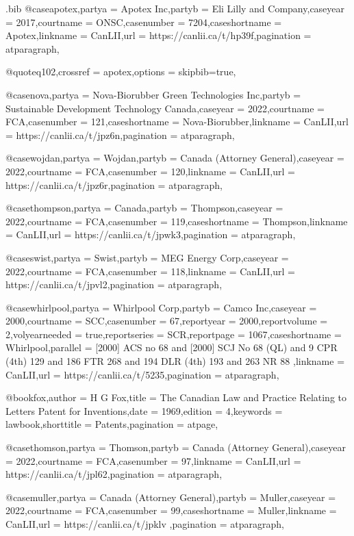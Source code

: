 \begin{filecontents*}[overwrite]{\jobname.bib}
@case{apotex,partya = {Apotex Inc},partyb = {Eli Lilly and Company},caseyear = {2017},courtname = {ONSC},casenumber = {7204},caseshortname = {Apotex},linkname = {CanLII},url = {https://canlii.ca/t/hp39f},pagination = {atparagraph},}

@quote{q102,crossref = {apotex},options = {skipbib=true},}

@case{nova,partya = {Nova-Biorubber Green Technologies Inc},partyb = {Sustainable Development Technology Canada},caseyear = {2022},courtname = {FCA},casenumber = {121},caseshortname = {Nova-Biorubber},linkname = {CanLII},url = {https://canlii.ca/t/jpz6n},pagination = {atparagraph},}

@case{wojdan,partya = {Wojdan},partyb = {Canada (Attorney General)},caseyear = {2022},courtname = {FCA},casenumber = {120},linkname = {CanLII},url = {https://canlii.ca/t/jpz6r},pagination = {atparagraph},}

@case{thompson,partya = {Canada},partyb = {Thompson},caseyear = {2022},courtname = {FCA},casenumber = {119},caseshortname = {Thompson},linkname = {CanLII},url = {https://canlii.ca/t/jpwk3},pagination = {atparagraph},}

@case{swist,partya = {Swist},partyb = {MEG Energy Corp},caseyear = {2022},courtname = {FCA},casenumber = {118},linkname = {CanLII},url = {https://canlii.ca/t/jpvl2},pagination = {atparagraph},}

@case{whirlpool,partya = {Whirlpool Corp},partyb = {Camco Inc},caseyear = {2000},courtname = {SCC},casenumber = {67},reportyear = {2000},reportvolume = {2},volyearneeded = {true},reportseries = {SCR},reportpage = {1067},caseshortname = {Whirlpool},parallel = { [2000] ACS no 68 and [2000] SCJ No 68 (QL) and 9 CPR (4th) 129 and 186 FTR 268 and 194 DLR (4th) 193 and 263 NR 88 },linkname = {CanLII},url = {https://canlii.ca/t/5235},pagination = {atparagraph},}

@book{fox,author = {H G Fox},title = {The Canadian Law and Practice Relating to Letters Patent for Inventions},date = {1969},edition = {4},keywords = {lawbook},shorttitle = {Patents},pagination = {atpage},}

@case{thomson,partya = {Thomson},partyb = {Canada (Attorney General)},caseyear = {2022},courtname = {FCA},casenumber = {97},linkname = {CanLII},url = {https://canlii.ca/t/jpl62},pagination = {atparagraph},}

@case{muller,partya = {Canada (Attorney General)},partyb = {Muller},caseyear = {2022},courtname = {FCA},casenumber = {99},caseshortname = {Muller},linkname = {CanLII},url = {https://canlii.ca/t/jpklv },pagination = {atparagraph},}








\end{filecontents*}



